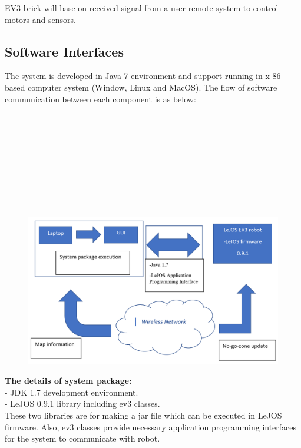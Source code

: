 \documentclass[10pt,a4paper,titlepage]{article}
\begin{document}
EV3 brick will base on received signal from a user remote system to control motors and sensors.\\

\subsection{Software Interfaces}

The system is developed in Java 7 environment and support running in x-86 based computer system (Window, Linux and MacOS). The flow of software communication between each component is as below:\\\\\\\\\\\\\\\\\\\\

\begin{figure}[h]
	\includegraphics[width=\linewidth]{software_interface.PNG}
	\label{fig:Flow of software communication}
\end{figure}

\textbf{The details of system package:}\\

-	JDK 1.7 development environment.\\
-	LeJOS 0.9.1 library including ev3 classes.\\

These two libraries are for making a jar file which can be executed in LeJOS firmware. Also, ev3 classes provide necessary application programming interfaces for the system to communicate with robot.\\
\end{document}
